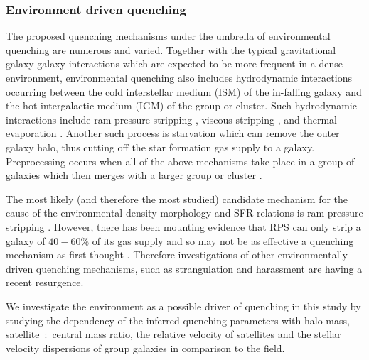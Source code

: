 \documentclass[useAMS,usenatbib]{mn2e}
\begin{document}
\subsubsection{Environment driven quenching}\label{sec:envquench}

The proposed quenching mechanisms under the umbrella of environmental quenching are numerous and varied. Together with the typical gravitational galaxy-galaxy interactions \citep{moore96} which are expected to be more frequent in a dense environment, environmental quenching also includes hydrodynamic interactions occurring between the cold interstellar medium (ISM) of the in-falling galaxy and the hot intergalactic medium (IGM) of the group or cluster. Such hydrodynamic interactions include ram pressure stripping \citep{gunngott72}, viscous stripping \citep{nulsen82}, and thermal evaporation \citep[a rapid rise in temperature of the ISM due to contact with the IGM;][]{cowie77}. Another such process is starvation \citep[also called strangulation;][]{larson80} which can remove the outer galaxy halo, thus cutting off the star formation gas supply to a galaxy. Preprocessing occurs when all of the above mechanisms take place in a group of galaxies which then merges with a larger group or cluster \citep{dressler04}. 

The most likely (and therefore the most studied) candidate mechanism for the cause of the environmental density-morphology and SFR relations is ram pressure stripping \citep[RPS;][]{abadi99, poggianti99}. However, there has been mounting evidence that RPS can only strip a galaxy of $40-60\%$ of its gas supply \citep{fillingham16} and so may not be as effective a quenching mechanism as first thought \citep{emerick16}. Therefore investigations of other environmentally driven quenching mechanisms, such as strangulation \citep{peng15, hahn16, maier16, paccagnella16, roberts16, vandevoort16} and harassment \citep[high speed galaxy `fly-by' gravitational interactions][]{bialas15, smith15b} are having a recent resurgence. 


We investigate the environment as a possible driver of quenching in this study by studying the dependency of the inferred quenching parameters with halo mass, satellite~:~central mass ratio, the relative velocity of satellites and the stellar velocity dispersions of group galaxies in comparison to the field. 
\\
\end{document}
